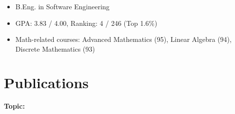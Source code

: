 \documentclass{resume}
\begin{document}
{
  \small 
\begin{itemize}
  \item B.Eng. in Software Engineering
  \item GPA: 3.83 / 4.00, Ranking: 4 / 246 (Top 1.6\%)
  \item Math-related courses: Advanced Mathematics (95), Linear Algebra (94), Discrete Mathematics (93)
\end{itemize}
}


\section{Publications}
\textbf{
  \large Topic: 
}
\end{document}

